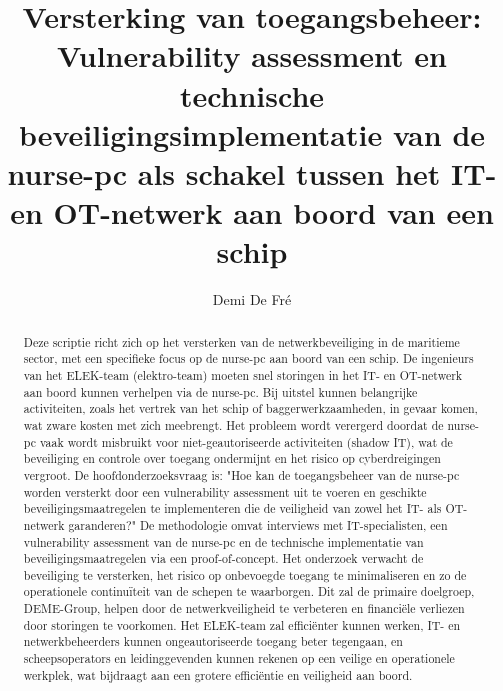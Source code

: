 \documentclass{hogent-article}
\title{Versterking van toegangsbeheer: Vulnerability assessment en 
technische beveiligingsimplementatie van de nurse-pc als schakel tussen het IT- en OT-netwerk aan boord van een schip}
\author{Demi De Fré}
\begin{document}
\begin{abstract}
  Deze scriptie richt zich op het versterken van de netwerkbeveiliging in de maritieme sector, met een specifieke focus op de 
  nurse-pc aan boord van een schip. De ingenieurs van het ELEK-team (elektro-team) moeten snel storingen in het IT- en OT-netwerk 
  aan boord kunnen verhelpen via de nurse-pc. Bij uitstel kunnen belangrijke activiteiten, zoals het vertrek van het schip of 
  baggerwerkzaamheden, in gevaar komen, wat zware kosten met zich meebrengt. Het probleem wordt verergerd doordat de nurse-pc 
  vaak wordt misbruikt voor niet-geautoriseerde activiteiten (shadow IT), wat de beveiliging en controle over toegang ondermijnt 
  en het risico op cyberdreigingen vergroot. De hoofdonderzoeksvraag is: "Hoe kan de toegangsbeheer van de nurse-pc worden 
  versterkt door een vulnerability assessment uit te voeren en geschikte beveiligingsmaatregelen te implementeren die de veiligheid 
  van zowel het IT- als OT-netwerk garanderen?" De methodologie omvat interviews met IT-specialisten, een vulnerability assessment 
  van de nurse-pc en de technische implementatie van beveiligingsmaatregelen via een proof-of-concept. Het onderzoek verwacht de 
  beveiliging te versterken, het risico op onbevoegde toegang te minimaliseren en zo de operationele continuïteit van de schepen 
  te waarborgen. Dit zal de primaire doelgroep, DEME-Group, helpen door de netwerkveiligheid te verbeteren en financiële verliezen 
  door storingen te voorkomen. Het ELEK-team zal efficiënter kunnen werken, IT- en netwerkbeheerders kunnen ongeautoriseerde toegang 
  beter tegengaan, en scheepsoperators en leidinggevenden kunnen rekenen op een veilige en operationele werkplek, wat bijdraagt aan 
  een grotere efficiëntie en veiligheid aan boord.
\end{abstract}

\tableofcontents



\printbibliography[heading=bibintoc]
\end{document}

